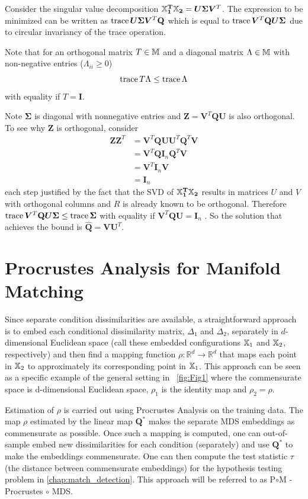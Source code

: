 \documentclass[12pt,oneside,final]{thesis}\usepackage[]{graphicx}\usepackage[]{color}
\begin{document}
 Consider the singular value decomposition $\mathbf{{\mathbb{X}}_1^T {\mathbb{X}}_2}=\bm{U} \bm{\Sigma} \bm{V}^T$. The expression to be minimized can be written as $\operatorname{trace} {\bm{U} \bm{\Sigma} \bm{V}^T \mathbf{Q}}$ which is equal to  $\operatorname{trace} { \bm{V}^T \mathbf{Q} \bm{U} \bm{\Sigma}} $ due to circular invariancy of the trace operation.
 
 Note that for an orthogonal matrix $T\in \mathbb{M}$ and a diagonal matrix $\Lambda \in \mathbb{M}$ with non-negative entries ($\Lambda_{ii}\geq 0$)
 \[
 \operatorname{trace}{ T \Lambda } \leq \operatorname{trace}{ \Lambda} \] with equality if $T=\bm{I}$.
 
 Note $\bm{\Sigma}$ is diagonal with nonnegative entries  and $\bm{Z}=\bm{V}^T \mathbf{Q} \bm{U}$ is also orthogonal. To see why $\bm{Z}$ is orthogonal, consider 
 \begin{align*}
 \bm{Z}\bm{Z}^T &= \bm{V}^T \mathbf{Q} \bm{U} \bm{U}^T \mathbf{Q}^T  \bm{V} \\
 &= \bm{V}^T \mathbf{Q} \bm{I}_n \mathbf{Q}^T  \bm{V}\\
 &= \bm{V}^T \bm{I}_n  \bm{V} \\
 &= \bm{I}_n
 \end{align*} 
 each step justified by the fact that the SVD of $\mathbf{{\mathbb{X}}_1^T {\mathbb{X}}_2}$ results in matrices  $U$ and $V$ with orthogonal columns and $R$ is already known to be orthogonal.
 Therefore  $\operatorname{trace} { \bm{V}^T \mathbf{Q} \bm{U} \bm{\Sigma}}  \leq \operatorname{trace} \bm{\Sigma}$ 
with equality if  $\bm{V}^T \mathbf{Q} \bm{U} = \bm{I}_n$ . So the solution  that achieves the bound is $\hat{\mathbf{Q}}= \bm{V}  \bm{U}^T$.

\section{Procrustes Analysis for Manifold Matching}

Since separate  condition dissimilarities are available, a straightforward approach is to embed each conditional dissimilarity matrix, $\Delta_1$ and $\Delta_2$, separately  in  $d$-dimensional Euclidean space (call these embedded configurations ${\mathbb{X}}_1$ and ${\mathbb{X}}_2$, respectively) and then find a mapping function $\rho :\mathbb{R}^{d}\rightarrow\mathbb{R}^{d}$ that maps each point in ${\mathbb{X}}_2$ to approximately its corresponding point in ${\mathbb{X}}_1$. This approach can be seen as a specific example of the general setting in  ~\autoref{fig:Fig1} where the commensurate space is d-dimensional  Euclidean space, $\rho_1$  is the identity map and $\rho_2=\rho$. 

Estimation of $\rho$ is carried out using  Procrustes Analysis  on the training data. The map $\rho$ estimated by the linear map $\mathbf{Q}^*$   makes the separate MDS embeddings as commensurate as possible. Once such a mapping is computed, one can out-of-sample embed  new dissimilarities for each condition (separately)  and  use $\mathbf{Q}^*$ to make the embeddings commensurate.
One can then compute the test statistic $\tau$ (the distance between commensurate embeddings) for  the hypothesis testing problem in \autoref{chap:match_detection}. This approach will be referred to  as P$\circ$M - Procrustes $\circ$ MDS.
\end{document}
